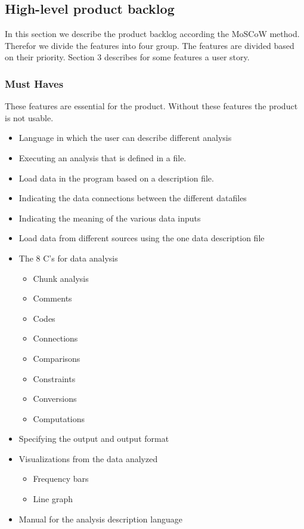 \subsection{High-level product backlog}
In this section we describe the product backlog according the MoSCoW method. Therefor we divide the features into four group. The features are divided based on their priority. Section 3 describes for some features a user story.
\subsubsection{Must Haves}
These features are essential for the product. Without these features the product is not usable.
\begin{itemize}
  \item Language in which the user can describe different analysis
  \item Executing an analysis that is defined in a file.
  \item Load data in the program based on a description file.
  \item Indicating the data connections between the different datafiles
  \item Indicating the meaning of the various data inputs
  \item Load data from different sources using the one data description file
  \item The 8 C's for data analysis
  \begin{itemize}
    \item Chunk analysis
    \item Comments
    \item Codes 
    \item Connections
    \item Comparisons
    \item Constraints
    \item Conversions
    \item Computations
  \end{itemize}
  \item Specifying the output and output format
  \item Visualizations from the data analyzed
  \begin{itemize}
  	\item Frequency bars
    \item Line graph
  \end{itemize}
  \item Manual for the analysis description language
\end{itemize}

